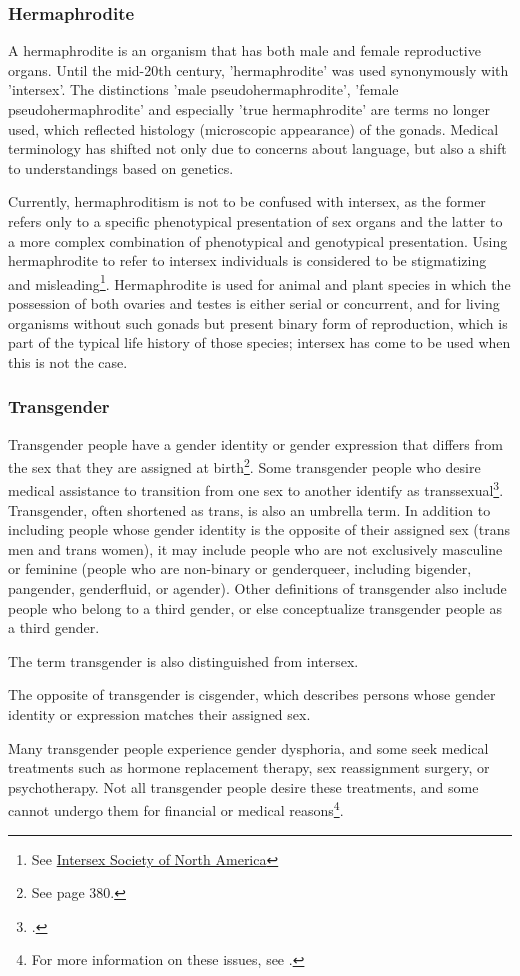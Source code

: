 \subsubsection{Hermaphrodite}
\label{hermaphrodite}
A hermaphrodite is an organism that has both male and female reproductive organs. Until the mid-20th century, 'hermaphrodite' was used synonymously with 'intersex'. The distinctions 'male pseudohermaphrodite', 'female pseudohermaphrodite' and especially 'true hermaphrodite' are terms no longer used, which reflected histology (microscopic appearance) of the gonads. Medical terminology has shifted not only due to concerns about language, but also a shift to understandings based on genetics.

Currently, hermaphroditism is not to be confused with intersex, as the former refers only to a specific phenotypical presentation of sex organs and the latter to a more complex combination of phenotypical and genotypical presentation. Using hermaphrodite to refer to intersex individuals is considered to be stigmatizing and misleading\footnote{See \href{https://web.archive.org/web/20130701061246/http://www.isna.org/faq/hermaphrodite}{Intersex Society of North America}}. Hermaphrodite is used for animal and plant species in which the possession of both ovaries and testes is either serial or concurrent, and for living organisms without such gonads but present binary form of reproduction, which is part of the typical life history of those species; intersex has come to be used when this is not the case.

\subsubsection{Transgender}
Transgender people have a gender identity or gender expression that differs from the sex that they are assigned at birth\footnote{See \cite{altilio} page 380.}. Some transgender people who desire medical assistance to transition from one sex to another identify as transsexual\footnote{\cite{polly}.}. Transgender, often shortened as trans, is also an umbrella term. In addition to including people whose gender identity is the opposite of their assigned sex (trans men and trans women), it may include people who are not exclusively masculine or feminine (people who are non-binary or genderqueer, including bigender, pangender, genderfluid, or agender). Other definitions of transgender also include people who belong to a third gender, or else conceptualize transgender people as a third gender.

The term transgender is also distinguished from intersex. 

The opposite of transgender is cisgender, which describes persons whose gender identity or expression matches their assigned sex.

Many transgender people experience gender dysphoria, and some seek medical treatments such as hormone replacement therapy, sex reassignment surgery, or psychotherapy. Not all transgender people desire these treatments, and some cannot undergo them for financial or medical reasons\footnote{For more information on these issues, see \cite{maizes}.}.
